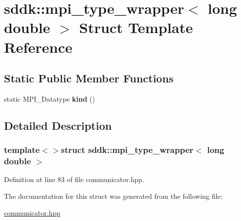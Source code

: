 \hypertarget{structsddk_1_1mpi__type__wrapper_3_01long_01double_01_4}{}\section{sddk\+:\+:mpi\+\_\+type\+\_\+wrapper$<$ long double $>$ Struct Template Reference}
\label{structsddk_1_1mpi__type__wrapper_3_01long_01double_01_4}
\subsection*{Static Public Member Functions}
\begin{DoxyCompactItemize}
\item 
\hypertarget{structsddk_1_1mpi__type__wrapper_3_01long_01double_01_4_ab4f45fd9dd2eadf690b41229ce2f1f37}{}static M\+P\+I\+\_\+\+Datatype {\bfseries kind} ()\label{structsddk_1_1mpi__type__wrapper_3_01long_01double_01_4_ab4f45fd9dd2eadf690b41229ce2f1f37}

\end{DoxyCompactItemize}


\subsection{Detailed Description}
\subsubsection*{template$<$$>$struct sddk\+::mpi\+\_\+type\+\_\+wrapper$<$ long double $>$}



Definition at line 83 of file communicator.\+hpp.



The documentation for this struct was generated from the following file\+:\begin{DoxyCompactItemize}
\item 
\hyperlink{communicator_8hpp}{communicator.\+hpp}\end{DoxyCompactItemize}
